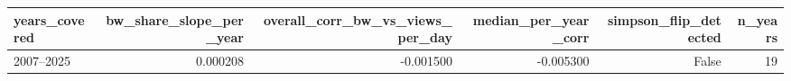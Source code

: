 \begin{tabular}{lrrrrr}
\toprule
years_covered & bw_share_slope_per_year & overall_corr_bw_vs_views_per_day & median_per_year_corr & simpson_flip_detected & n_years \\
\midrule
2007–2025 & 0.000208 & -0.001500 & -0.005300 & False & 19 \\
\bottomrule
\end{tabular}
